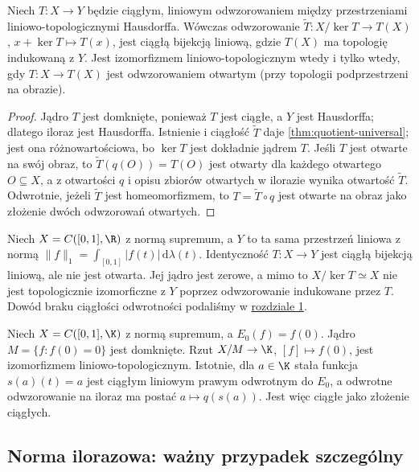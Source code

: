 \begin{wniosek}
Niech $T:X\to Y$ będzie ciągłym, liniowym odwzorowaniem
między przestrzeniami liniowo-topologicznymi Hausdorffa.
Wówczas odwzorowanie
$\widetilde T:X/\ker T\to T(X)$, $x+\ker T\mapsto T(x)$,
jest ciągłą bijekcją liniową, gdzie $T(X)$ ma topologię
indukowaną z $Y$. Jest izomorfizmem liniowo-topologicznym
wtedy i tylko wtedy, gdy $T:X\to T(X)$ jest odwzorowaniem
otwartym (przy topologii podprzestrzeni na obrazie).
\end{wniosek}
\begin{proof}
Jądro $T$ jest domknięte, ponieważ $T$ jest ciągłe,
a $Y$ jest Hausdorffa; dlatego iloraz jest Hausdorffa.
Istnienie i ciągłość $\widetilde T$ daje
\ref{thm:quotient-universal}; jest ona różnowartościowa,
bo $\ker T$ jest dokładnie jądrem $T$.
Jeśli $T$ jest otwarte na swój obraz, to
$\widetilde T(q(O))=T(O)$ jest otwarty dla każdego otwartego
$O\subseteq X$, a z otwartości $q$ i opisu zbiorów
otwartych w ilorazie wynika otwartość $\widetilde T$.
Odwrotnie, jeżeli $\widetilde T$ jest homeomorfizmem,
to $T=\widetilde T\circ q$ jest otwarte na obraz jako
złożenie dwóch odwzorowań otwartych.
\end{proof}

\begin{przyklad}
Niech $X=C([0,1],\R)$ z normą supremum, a $Y$ to ta sama
przestrzeń liniowa z normą $\|f\|_1=\int_{[0,1]}|f(t)|\,\mathrm d\lambda(t)$.
Identyczność $T:X\to Y$ jest ciągłą bijekcją liniową,
ale nie jest otwarta. Jej jądro jest zerowe, a mimo to
$X/\ker T\simeq X$ nie jest topologicznie izomorficzne z $Y$
poprzez odwzorowanie indukowane przez $T$. Dowód braku
ciągłości odwrotności podaliśmy w \hyperref[sec:tvs]{rozdziale 1}.
\end{przyklad}

\begin{przyklad}
Niech $X=C([0,1],\K)$ z normą supremum, a
$E_0(f)=f(0)$. Jądro $M=\{f:f(0)=0\}$ jest domknięte.
Rzut $X/M\to\K$, $[f]\mapsto f(0)$, jest izomorfizmem
liniowo-topologicznym. Istotnie, dla $a\in\K$ stała
funkcja $s(a)(t)=a$ jest ciągłym liniowym prawym odwrotnym
do $E_0$, a odwrotne odwzorowanie na iloraz ma postać
$a\mapsto q(s(a))$. Jest więc ciągłe jako złożenie ciągłych.
\end{przyklad}

\subsection{Norma ilorazowa: ważny przypadek szczególny}

